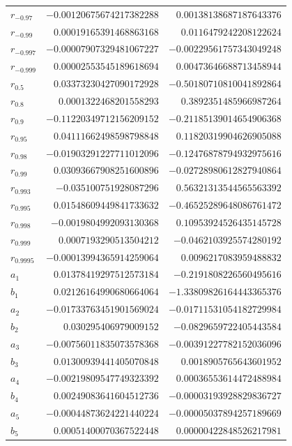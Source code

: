 \documentclass[11pt]{article}
\theoremstyle{definition}
\begin{document}
{\begin{longtable}{lrr}
$r_{-0.97}$ & $-0.00120675674217382288$ & $0.00138138687187643376$\\
$r_{-0.99}$ & $0.00019165391468863168$ & $0.0116479242208122624$\\
$r_{-0.997}$ & $-0.00007907329481067227$ & $-0.00229561757343049248$\\
$r_{-0.999}$ & $0.00002553545189618694$ & $0.00473646688713458944$\\
$r_{0.5}$ & $0.03373230427090172928$ & $-0.50180710810041892864$\\
$r_{0.8}$ & $0.0001322468201558293$ & $0.3892351485966987264$\\
$r_{0.9}$ & $-0.11220349712156209152$ & $-0.21185139014654906368$\\
$r_{0.95}$ & $0.04111662498598798848$ & $0.11820319904626905088$\\
$r_{0.98}$ & $-0.01903291227711012096$ & $-0.12476878794932975616$\\
$r_{0.99}$ & $0.03093667908251600896$ & $-0.02728980612827940864$\\
$r_{0.993}$ & $-0.035100751928087296$ & $0.56321313544565563392$\\
$r_{0.995}$ & $0.01548609449841733632$ & $-0.46525289648086761472$\\
$r_{0.998}$ & $-0.0019804992093130368$ & $0.10953924526435145728$\\
$r_{0.999}$ & $0.0007193290513504212$ & $-0.0462103925574280192$\\
$r_{0.9995}$ & $-0.00013994365914259064$ & $0.0096217083959488832$\\
$a_{1}$ & $0.01378419297512573184$ & $-0.2191808226560495616$\\
$b_{1}$ & $0.02126164990680664064$ & $-1.33809826164443365376$\\
$a_{2}$ & $-0.01733763451901569024$ & $-0.01711531054182729984$\\
$b_{2}$ & $0.030295406979009152$ & $-0.0829659722405443584$\\
$a_{3}$ & $-0.00756011835073578368$ & $-0.00391227782152036096$\\
$b_{3}$ & $0.01300939441405070848$ & $0.0018905765643601952$\\
$a_{4}$ & $-0.00219809547749323392$ & $0.00036553614472488984$\\
$b_{4}$ & $0.00249083641604512736$ & $-0.00003193928829836727$\\
$a_{5}$ & $-0.00044873624221440224$ & $-0.00005037894257189669$\\
$b_{5}$ & $0.00051400070367522448$ & $0.00000422848526217981$\\

\end{longtable}}
\end{document}
